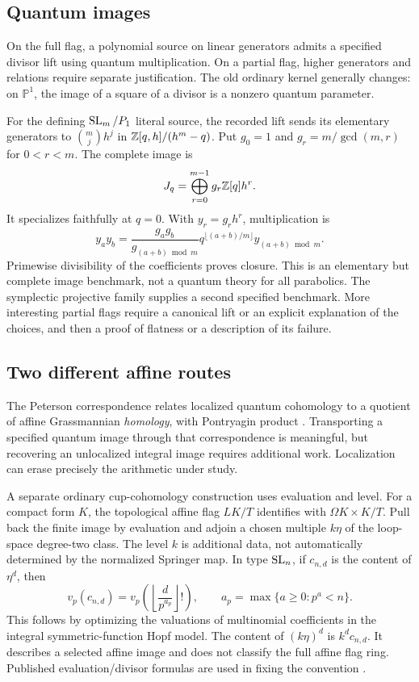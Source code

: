 \subsection{Quantum images}
On the full flag, a polynomial source on linear generators admits a specified divisor lift using quantum multiplication. On a partial flag, higher generators and relations require separate justification. The old ordinary kernel generally changes: on $\mathbb P^1$, the image of a square of a divisor is a nonzero quantum parameter.

For the defining $\operatorname{SL}_m/P_1$ literal source, the recorded lift sends its elementary generators to $\binom mj h^j$ in $\mathbb Z[q,h]/(h^m-q)$. Put $g_0=1$ and $g_r=m/\gcd(m,r)$ for $0<r<m$. The complete image is
\[
 J_q=\bigoplus_{r=0}^{m-1}g_r\mathbb Z[q]h^r.
\]
It specializes faithfully at $q=0$. With $y_r=g_rh^r$, multiplication is
\[
 y_ay_b=\frac{g_ag_b}{g_{(a+b)\bmod m}}
 q^{\lfloor(a+b)/m\rfloor}y_{(a+b)\bmod m}.
\]
Primewise divisibility of the coefficients proves closure. This is an elementary but complete image benchmark, not a quantum theory for all parabolics. The symplectic projective family supplies a second specified benchmark. More interesting partial flags require a canonical lift or an explicit explanation of the choices, and then a proof of flatness or a description of its failure.

\subsection{Two different affine routes}
The Peterson correspondence relates localized quantum cohomology to a quotient of affine Grassmannian \emph{homology}, with Pontryagin product \cite{LS}. Transporting a specified quantum image through that correspondence is meaningful, but recovering an unlocalized integral image requires additional work. Localization can erase precisely the arithmetic under study.

A separate ordinary cup-cohomology construction uses evaluation and level. For a compact form $K$, the topological affine flag $LK/T$ identifies with $\Omega K\times K/T$. Pull back the finite image by evaluation and adjoin a chosen multiple $k\eta$ of the loop-space degree-two class. The level $k$ is additional data, not automatically determined by the normalized Springer map. In type $\operatorname{SL}_n$, if $c_{n,d}$ is the content of $\eta^d$, then
\[
 v_p(c_{n,d})=v_p\!\left(\left\lfloor\frac{d}{p^{a_p}}\right\rfloor!\right),
 \qquad a_p=\max\{a\ge0:p^a<n\}.
\]
This follows by optimizing the valuations of multinomial coefficients in the integral symmetric-function Hopf model. The content of $(k\eta)^d$ is $k^dc_{n,d}$. It describes a selected affine image and does not classify the full affine flag ring. Published evaluation/divisor formulas are used in fixing the convention \cite{MM}.

